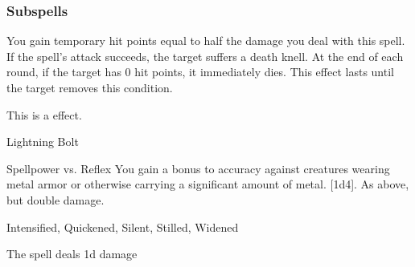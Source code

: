 \subsubsection{Subspells}
You gain temporary hit points equal to half the damage you deal with this spell.
If the spell's attack succeeds, the target suffers a death knell.
At the end of each round, if the target has 0 hit points, it immediately dies.
This effect lasts until the target removes this condition.
\par
This is a  effect.
\begin{spellsection}{Lightning Bolt}
\begin{spellheader}
\end{spellheader}
\begin{spellcontent}
\begin{spelltargetinginfo}
\end{spelltargetinginfo}
\begin{spelleffects}
\begin{spellattack}{Spellpower vs. Reflex}
\spellspecial You gain a  bonus to accuracy against creatures wearing metal armor or otherwise carrying a significant amount of metal.
\spellsuccess
{}[1d4].
\spellcritical As above, but double damage.
\end{spellattack}
\end{spelleffects}
\end{spellcontent}
\begin{spellfooter}
 Intensified, Quickened, Silent, Stilled, Widened
\end{spellfooter}
\begin{spellsubcontent}
\begin{spellcantrip}
The spell deals \minus1d damage
\end{spellcantrip}
\end{spellsubcontent}
\end{spellsection}
